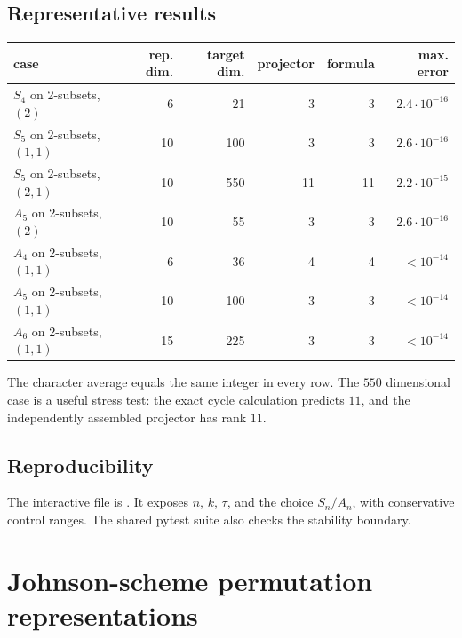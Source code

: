\documentclass[10pt]{article}
\newcommand{\Sym}{\operatorname{Sym}}
\newcommand{\Fix}{\operatorname{Fix}}
\newcommand{\SMG}{\operatorname{SMG}}
\newcommand{\Aut}{\operatorname{Aut}}
\begin{document}
\subsection{Representative results}
\begin{center}
\small
\begin{tabular}{@{}lrrrrr@{}}
\toprule
case & rep. dim. & target dim. & projector & formula & max. error\\
\midrule
$S_4$ on 2-subsets, $(2)$ & 6 & 21 & 3 & 3 & $2.4\cdot10^{-16}$\\
$S_5$ on 2-subsets, $(1,1)$ & 10 & 100 & 3 & 3 & $2.6\cdot10^{-16}$\\
$S_5$ on 2-subsets, $(2,1)$ & 10 & 550 & 11 & 11 & $2.2\cdot10^{-15}$\\
$A_5$ on 2-subsets, $(2)$ & 10 & 55 & 3 & 3 & $2.6\cdot10^{-16}$\\
$A_4$ on 2-subsets, $(1,1)$ & 6 & 36 & 4 & 4 & $<10^{-14}$\\
$A_5$ on 2-subsets, $(1,1)$ & 10 & 100 & 3 & 3 & $<10^{-14}$\\
$A_6$ on 2-subsets, $(1,1)$ & 15 & 225 & 3 & 3 & $<10^{-14}$\\
\bottomrule
\end{tabular}
\end{center}
The character average equals the same integer in every row.  The $550$
dimensional case is a useful stress test: the exact cycle calculation predicts
$11$, and the independently assembled projector has rank $11$.

\subsection*{Reproducibility}
The interactive file is
.  It
exposes $n$, $k$, $\tau$,
and the choice $S_n/A_n$, with conservative control ranges.  The shared pytest
suite also checks the stability boundary.
\endgroup


\clearpage
\section{Johnson-scheme permutation representations}\label{proof:johnson}
\begingroup
\providecommand{\Sym}{\operatorname{Sym}}
\renewcommand{\Sym}{\operatorname{Sym}}
\providecommand{\Fix}{\operatorname{Fix}}
\renewcommand{\Fix}{\operatorname{Fix}}
\providecommand{\Aut}{\operatorname{Aut}}
\renewcommand{\Aut}{\operatorname{Aut}}
\providecommand{\cS}{\SMG}
\renewcommand{\cS}{\SMG}
\setcounter{theorem}{0}
\setcounter{proposition}{0}
\setcounter{lemma}{0}
\setcounter{corollary}{0}
\setcounter{remark}{0}
\begin{abstract}
For the permutation representation on the $k$-subsets of $[v]$, we prove the
cycle-factor and orbit formulas, derive the fixed-subset formula, treat the
middle-dimensional complementation coset, and verify all coefficients through
total degree three in three representative finite cases.  The computation uses
the actual permutation matrices and does not assume the desired cycle formula.
\end{abstract}
\end{document}
